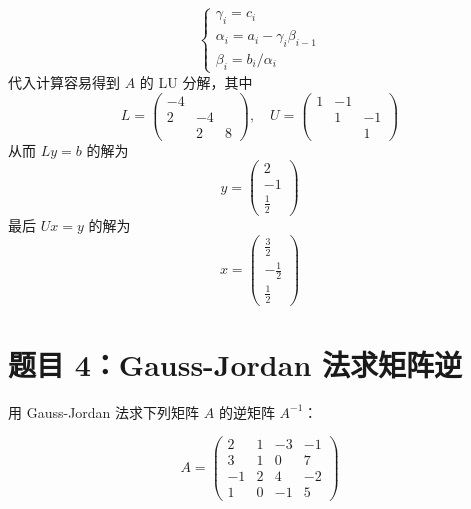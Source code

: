\documentclass{article}
\begin{document}
\begin{solution}
  \[
    \begin{cases}
      \gamma_i = c_i \\
      \alpha_i = a_i - \gamma_i \beta_{i-1} \\
      \beta_i = b_i / \alpha_i
    \end{cases}
  \]
  代入计算容易得到 $A$ 的 LU 分解，其中
  \[
    L =
    \begin{pmatrix}
      -4 & & \\
      2 & -4 & \\
      & 2 & 8
    \end{pmatrix}, \quad
    U =
    \begin{pmatrix}
      1 & -1 & \\
      & 1 & -1 \\
      & & 1
    \end{pmatrix}
  \]
  从而 $Ly = b$ 的解为
  \[
    y =
    \begin{pmatrix}
      2 \\ -1 \\ \frac{1}{2}
    \end{pmatrix}
  \]
  最后 $Ux = y$ 的解为
  \[
    x =
    \begin{pmatrix}
      \frac{3}{2} \\ -\frac{1}{2} \\ \frac{1}{2}
    \end{pmatrix}
  \]
\end{solution}

\section{题目 4：Gauss-Jordan 法求矩阵逆}

用 Gauss-Jordan 法求下列矩阵 $A$ 的逆矩阵 $A^{-1}$：

\[
  A =
  \begin{pmatrix}
    2 & 1 & -3 & -1 \\
    3 & 1 & 0 & 7 \\
    -1 & 2 & 4 & -2 \\
    1 & 0 & -1 & 5
  \end{pmatrix}
\]
\end{document}
